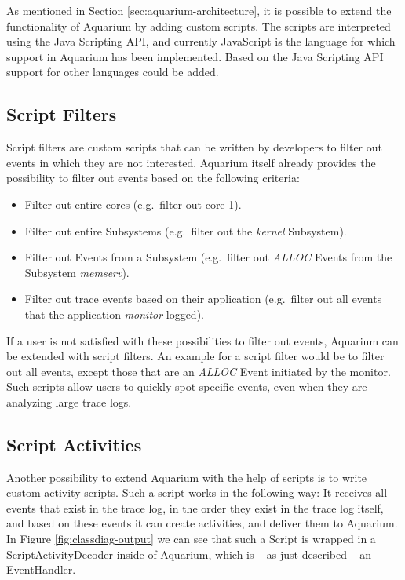 \documentclass[a4paper,11pt,twoside]{report}
\begin{document}
As mentioned in Section \ref{sec:aquarium-architecture}, it is possible to
extend the functionality of Aquarium by adding custom scripts. The scripts are
interpreted using the Java Scripting API, and currently JavaScript is the
language for which support in Aquarium has been implemented. Based on the Java
Scripting API support for other languages could be added.

\subsection{Script Filters}

Script filters are custom scripts that can be written by developers to filter
out events in which they are not interested. Aquarium itself already provides
the possibility to filter out events based on the following criteria:

\begin{itemize}
	\item Filter out entire cores (e.g.~filter out core 1).
	\item Filter out entire Subsystems (e.g.~filter out the \emph{kernel}
		Subsystem).
	\item Filter out Events from a Subsystem (e.g.~filter out \emph{ALLOC}
		Events from the Subsystem \emph{memserv}).
	\item Filter out trace events based on their application (e.g.~filter out
		all events that the application \emph{monitor} logged).
\end{itemize}

If a user is not satisfied with these possibilities to filter out events,
Aquarium can be extended with script filters. An example for a script filter
would be to filter out all events, except those that are an \emph{ALLOC} Event
initiated by the monitor. Such scripts allow users to quickly spot specific
events, even when they are analyzing large trace logs.

\subsection{Script Activities}

Another possibility to extend Aquarium with the help of scripts is to write
custom activity scripts. Such a script works in the following way: It receives
all events that exist in the trace log, in the order they exist in the trace log
itself, and based on these events it can create activities, and deliver them to
Aquarium. In Figure \ref{fig:classdiag-output} we can see that such a Script is
wrapped in a ScriptActivityDecoder inside of Aquarium, which is -- as just
described -- an EventHandler.
\end{document}
